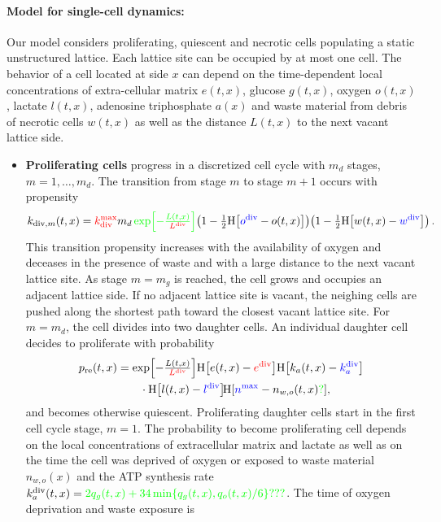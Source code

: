 \documentclass[10pt,letterpaper]{article}
\newcommand{\Heaviside}[1]{{\mathrm{H}\!\left[#1\right]}}
\newcommand{\sI}[1]{{\color{red}#1}}
\newcommand{\sII}[1]{{\color{blue}#1}}
\begin{document}
\paragraph{Model for single-cell dynamics:}
Our model considers proliferating, quiescent and necrotic cells populating a static unstructured lattice. Each lattice site can be occupied by at most one cell. The behavior of a cell located at side $x$ can depend on the time-dependent local concentrations of extra-cellular matrix $e(t,x)$, glucose $g(t,x)$, oxygen $o(t,x)$, lactate $l(t,x)$, adenosine triphosphate $a(x)$ and waste material from debris of necrotic cells $w(t,x)$ as well as the distance $L(t,x)$ to the next vacant lattice side. 
\begin{itemize}
%
\item \textbf{Proliferating cells} progress in a discretized cell cycle with $m_d$ stages, $m = 1,\ldots, m_d$. The transition from stage $m$ to stage $m+1$ occurs with propensity
\begin{equation*}
k_{\text{div},m}(t,x)  = \sI{k_{\text{div}}^{\max}} m_{d} \, {\color{green} \exp\!\left[-\tfrac{L(t,x)}{\sI{L^{\text{div}}}}\right]} \!  \left(1 - \tfrac{1}{2} \Heaviside{\sII{o^{\text{div}}} - o(t,x)}\right) \! \left(1 - \tfrac{1}{2} \Heaviside{w(t,x)-\sII{w^{\text{div}}}}\right).
\end{equation*}
This transition propensity increases with the availability of oxygen and deceases in the presence of waste and with a large distance to the next vacant lattice site. As stage $m = m_g$ is reached, the cell grows and occupies an adjacent lattice side. If no adjacent lattice site is vacant, the neighing cells are pushed along the shortest path toward the closest vacant lattice site. For $m = m_{d}$, the cell divides into two daughter cells. An individual daughter cell decides to proliferate with probability
\begin{equation*}
\begin{aligned}
p_{\text{re}}(t,x) &= \exp\!\left[-\tfrac{L(t,x)}{\sI{L^{\text{div}}}}\right] \! \Heaviside{e(t,x)-\sI{e^{\text{div}}}} \Heaviside{k_a(t,x)-\sII{k_a^{\text{div}}}} \\
& \qquad \cdot \Heaviside{l(t,x)-\sII{l^{\text{div}}}} \! \Heaviside{\sII{n^{\max}} - n_{w,o}(t,x){\color{green}?}},
\end{aligned}
\end{equation*}
and becomes otherwise quiescent. Proliferating daughter cells start in the first cell cycle stage, $m = 1$. The probability to become proliferating cell depends on the local concentrations of extracellular matrix and lactate as well as on the time the cell was deprived of oxygen or exposed to waste material $n_{w,o}(x)$ and the ATP synthesis rate $k_a^{\text{div}}(t,x) = {\color{green}2 q_g(t,x) + 34 \min\{q_g(t,x),q_o(t,x)/6\}???}$. The time of oxygen deprivation and waste exposure is

\end{itemize}
\end{document}
